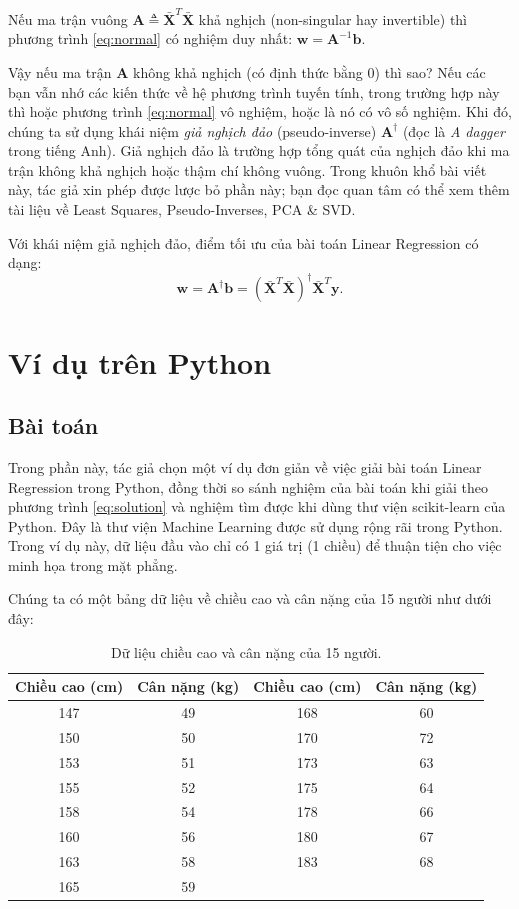 \documentclass[runningheads]{llncs}
\begin{document}
Nếu ma trận vuông $\mathbf{A} \triangleq \bar{\mathbf{X}}^T\bar{\mathbf{X}}$
khả nghịch (non-singular hay invertible) thì phương trình \eqref{eq:normal}
có nghiệm duy nhất: $\mathbf{w} = \mathbf{A}^{-1}\mathbf{b}$.

Vậy nếu ma trận $\mathbf{A}$ không khả nghịch (có định thức bằng 0) thì sao?
Nếu các bạn vẫn nhớ các kiến thức về hệ phương trình tuyến tính, trong trường
hợp này thì hoặc phương trình \eqref{eq:normal} vô nghiệm, hoặc là nó có vô
số nghiệm. Khi đó, chúng ta sử dụng khái niệm \emph{giả nghịch đảo}
(pseudo-inverse) $\mathbf{A}^{\dagger}$ (đọc là \emph{A dagger} trong tiếng
Anh). Giả nghịch đảo là trường hợp tổng quát của nghịch đảo khi ma trận không
khả nghịch hoặc thậm chí không vuông. Trong khuôn khổ bài viết này, tác giả
xin phép được lược bỏ phần này; bạn đọc quan tâm có thể xem thêm tài liệu về
Least Squares, Pseudo-Inverses, PCA \& SVD.

Với khái niệm giả nghịch đảo, điểm tối ưu của bài toán Linear Regression có
dạng:
\begin{equation}
\label{eq:solution}
\mathbf{w}
= \mathbf{A}^{\dagger}\mathbf{b}
= \left(\bar{\mathbf{X}}^T\bar{\mathbf{X}}\right)^{\dagger}
  \bar{\mathbf{X}}^T\mathbf{y}.
\end{equation}

\section{Ví dụ trên Python}

\subsection{Bài toán}

Trong phần này, tác giả chọn một ví dụ đơn giản về việc giải bài toán Linear
Regression trong Python, đồng thời so sánh nghiệm của bài toán khi giải theo
phương trình \eqref{eq:solution} và nghiệm tìm được khi dùng thư viện
scikit-learn của Python. Đây là thư viện Machine Learning được sử dụng rộng
rãi trong Python. Trong ví dụ này, dữ liệu đầu vào chỉ có 1 giá trị (1 chiều)
để thuận tiện cho việc minh họa trong mặt phẳng.

Chúng ta có một bảng dữ liệu về chiều cao và cân nặng của 15 người như dưới
đây:

\begin{table}[htbp]
\centering
\small
\caption{Dữ liệu chiều cao và cân nặng của 15 người.}
\label{tab:height-weight}
\begin{tabular}{cccc}
\toprule
Chiều cao (cm) & Cân nặng (kg) & Chiều cao (cm) & Cân nặng (kg) \\
\midrule
147 & 49 & 168 & 60 \\
150 & 50 & 170 & 72 \\
153 & 51 & 173 & 63 \\
155 & 52 & 175 & 64 \\
158 & 54 & 178 & 66 \\
160 & 56 & 180 & 67 \\
163 & 58 & 183 & 68 \\
165 & 59 &     &    \\
\bottomrule
\end{tabular}
\end{table}
\end{document}
